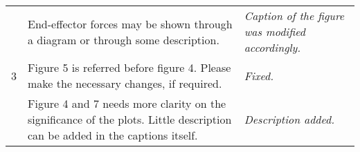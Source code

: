 \documentclass{article}
\begin{document}
\begin{table}
\begin{tabular}{ |c|p{9cm}|p{5cm}| }
		\multirow{3}{*}{3} & End-effector forces may be shown through a diagram or through some description.                                                                                                                                                                                                                                                                                                                                            & \textit{Caption of the figure was modified accordingly.}                                                                                                                 \\ \cline{2-3}
		                   & Figure 5 is referred before figure 4. Please make the necessary changes, if required.                                                                                                                                                                                                                                                                                                                                      & \textit{Fixed.}                                                                                                                             \\ \cline{2-3}
		                   & Figure 4 and 7 needs more clarity on the significance of the plots. Little description can be added in the captions itself.                                                                                                                                                                                                                                                                                                & \textit{Description added.}                                                                                                                 \\ \hline
	\end{tabular}
\end{table}


%	      
%	      
%	      
\end{document}
